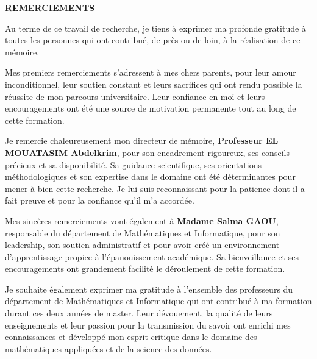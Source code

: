 \newpage
\thispagestyle{empty}

\begin{center}
    \vspace{2cm}
    {\Large \textbf{\color{blueuniv}REMERCIEMENTS}}
    \vspace{1.5cm}
\end{center}

\noindent
Au terme de ce travail de recherche, je tiens à exprimer ma profonde gratitude à toutes les personnes qui ont contribué, de près ou de loin, à la réalisation de ce mémoire.

\vspace{0.7cm}

\noindent
Mes premiers remerciements s'adressent à mes chers parents, pour leur amour inconditionnel, leur soutien constant et leurs sacrifices qui ont rendu possible la réussite de mon parcours universitaire. Leur confiance en moi et leurs encouragements ont été une source de motivation permanente tout au long de cette formation.

\vspace{0.7cm}

\noindent
Je remercie chaleureusement mon directeur de mémoire, \textbf{Professeur EL MOUATASIM Abdelkrim}, pour son encadrement rigoureux, ses conseils précieux et sa disponibilité. Sa guidance scientifique, ses orientations méthodologiques et son expertise dans le domaine ont été déterminantes pour mener à bien cette recherche. Je lui suis reconnaissant pour la patience dont il a fait preuve et pour la confiance qu'il m'a accordée.

\vspace{0.7cm}

\noindent
Mes sincères remerciements vont également à \textbf{Madame Salma GAOU}, responsable du département de Mathématiques et Informatique, pour son leadership, son soutien administratif et pour avoir créé un environnement d'apprentissage propice à l'épanouissement académique. Sa bienveillance et ses encouragements ont grandement facilité le déroulement de cette formation.

\vspace{0.7cm}

\noindent
Je souhaite également exprimer ma gratitude à l'ensemble des professeurs du département de Mathématiques et Informatique qui ont contribué à ma formation durant ces deux années de master. Leur dévouement, la qualité de leurs enseignements et leur passion pour la transmission du savoir ont enrichi mes connaissances et développé mon esprit critique dans le domaine des mathématiques appliquées et de la science des données.

